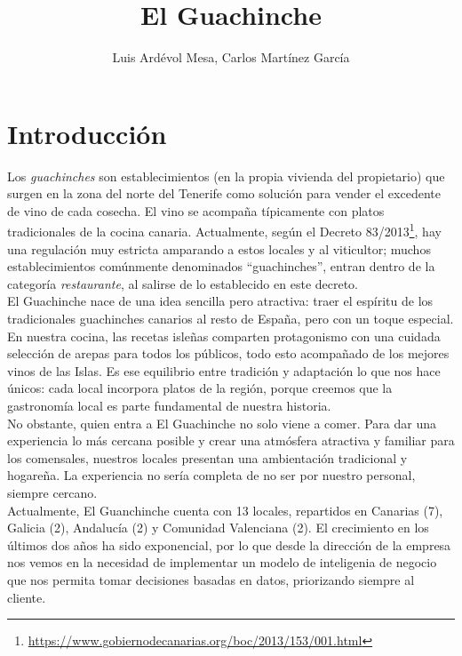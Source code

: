 \documentclass[12pt]{opticajnl}
\title{El Guachinche}
\author[1,2,3]{Luis Ardévol Mesa, Carlos Martínez García}
\begin{document}
\maketitle

\section{Introducción}

Los \textit{guachinches} son establecimientos (en la propia vivienda del propietario) que surgen en la zona del norte del Tenerife como solución para vender el excedente de vino de cada cosecha. El vino se acompaña típicamente con platos tradicionales de la cocina canaria. Actualmente, según el Decreto 83/2013\footnote{\url{https://www.gobiernodecanarias.org/boc/2013/153/001.html}}, hay una regulación muy estricta amparando a estos locales y al viticultor; muchos establecimientos comúnmente denominados ``guachinches'', entran dentro de la categoría \textit{restaurante}, al salirse de lo establecido en este decreto. \\

El Guachinche nace de una idea sencilla pero atractiva: traer el espíritu de los tradicionales guachinches canarios al resto de España, pero con un toque especial. En nuestra cocina, las recetas isleñas comparten protagonismo con una cuidada selección de arepas para todos los públicos, todo esto acompañado de los mejores vinos de las Islas. Es ese equilibrio entre tradición y adaptación lo que nos hace únicos: cada local incorpora platos de la región, porque creemos que la gastronomía local es parte fundamental de nuestra historia. \\

No obstante, quien entra a El Guachinche no solo viene a comer. Para dar una experiencia lo más cercana posible y crear una atmósfera atractiva y familiar para los comensales, nuestros locales presentan una ambientación tradicional y hogareña. La experiencia no sería completa de no ser por nuestro personal, siempre cercano. \\

Actualmente, El Guanchinche cuenta con 13 locales, repartidos en Canarias (7), Galicia (2), Andalucía (2) y Comunidad Valenciana (2). El crecimiento en los últimos dos años ha sido exponencial, por lo que desde la dirección de la empresa nos vemos en la necesidad de implementar un modelo de inteligenia de negocio que nos permita tomar decisiones basadas en datos, priorizando siempre al cliente. 
\end{document}
